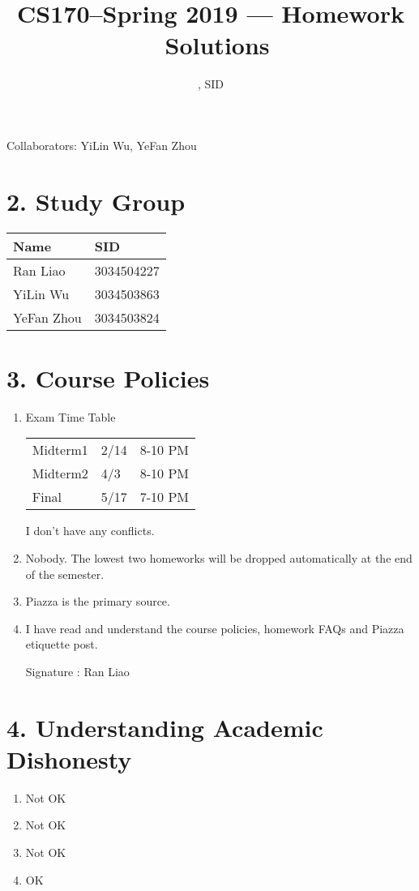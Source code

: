 \documentclass[11pt]{article}
\title{CS170--Spring 2019 --- Homework \Homework\ Solutions}
\author{\Name, SID \SID}
\date{}
\newenvironment{qparts}{\begin{enumerate}[{(}a{)}]}{\end{enumerate}}
\begin{document}
\maketitle
Collaborators: YiLin Wu, YeFan Zhou

\section*{2. Study Group}
\begin{tabular}{ll}
    Name        &   SID         \\\hline
    Ran Liao    &   3034504227  \\  
    YiLin Wu    &   3034503863  \\
    YeFan Zhou  &   3034503824 
\end{tabular}

\newpage
\section*{3. Course Policies}
\begin{qparts}
\item Exam Time Table

\begin{tabular}{lll}
    Midterm1    &   2/14    &   8-10 PM     \\   
    Midterm2    &   4/3     &   8-10 PM     \\   
    Final       &   5/17    &   7-10 PM     \\   
\end{tabular}

I don't have any conflicts.

\item Nobody. The lowest two homeworks will be dropped automatically at the end of the semester.

\item Piazza is the primary source.

\item I have read and understand the course policies, homework FAQs and Piazza etiquette post.

Signature : Ran Liao

\end{qparts}

\newpage
\section*{4. Understanding Academic Dishonesty}
\begin{qparts}
\item Not OK
\item Not OK
\item Not OK
\item OK

\end{qparts}
\end{document}
